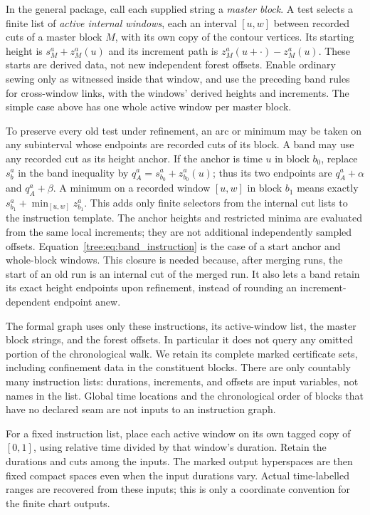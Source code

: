 In the general package, call each supplied string a \emph{master block}.
A test selects a finite list of \emph{active internal windows}, each
an interval $[u,w]$ between recorded cuts of a master block $M$, with
its own copy of the contour vertices. Its starting height is
$s_M^a+z_M^a(u)$ and its increment path is
$z_M^a(u+\cdot)-z_M^a(u)$. These starts are derived data, not new
independent forest offsets. Enable ordinary sewing only as witnessed
inside that window, and use the preceding band rules for cross-window
links, with the windows' derived heights and increments. The simple
case above has one whole active window per master block.

To preserve every old test under refinement, an arc or
minimum may be taken on any subinterval whose endpoints are recorded
cuts of its block.  A band may use any recorded cut as its height
anchor.  If the anchor is time $u$ in block $b_0$, replace $s_b^a$ in
the band inequality by
$q_A^a=s_{b_0}^a+z_{b_0}^a(u)$; thus its two endpoints are
$q_A^a+\alpha$ and $q_A^a+\beta$.  A minimum on a recorded window
$[u,w]$ in block $b_1$ means exactly
$s_{b_1}^a+\min_{[u,w]}z_{b_1}^a$.  This adds only finite selectors
from the internal cut lists to the instruction template.  The anchor
heights and restricted minima are evaluated from the same local
increments; they are not additional independently sampled offsets.
Equation~\eqref{tree:eq:band_instruction} is the case of a start anchor and
whole-block windows.  This closure is needed because, after merging
runs, the start of an old run is an internal cut of the merged run.
It also lets a band retain its exact height endpoints upon refinement,
instead of rounding an increment-dependent endpoint anew.

The formal graph uses only these instructions, its active-window list,
the master block strings, and
the forest offsets.  In particular it does not query any omitted portion
of the chronological walk.  We retain its complete marked certificate
sets, including confinement data in the constituent blocks.  There are
only countably many instruction lists: durations, increments, and offsets
are input variables, not names in the list.  Global time locations and
the chronological order of blocks that have no declared seam are not
inputs to an instruction graph.

For a fixed instruction list, place each active window on its own tagged
copy of $[0,1]$, using relative time divided by that window's duration.
Retain the durations and cuts among the inputs. The marked output
hyperspaces are then fixed compact spaces even when the input durations
vary. Actual time-labelled ranges are recovered from these inputs;
this is only a coordinate convention for the finite chart outputs.


